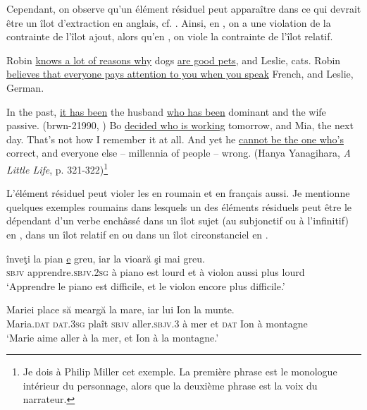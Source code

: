 Cependant, on observe qu’un élément résiduel peut apparaître dans ce qui devrait être un îlot d’extraction en anglais, cf. \citet{CulicoverEtAl2005}. Ainsi, en , on a une violation de la contrainte de l’îlot ajout, alors qu’en , on viole la contrainte de l’îlot relatif.

\ea \label{ch2:ex216}
\ea Robin \uline{knows a lot of reasons why} dogs \uline{are good pets}, and Leslie, cats. \citep[273]{CulicoverEtAl2005}     
\ex Robin \uline{believes that everyone pays attention to you when you speak} French, and Leslie, German. \citep[273]{CulicoverEtAl2005}
\z
\z

\ea \label{ch2:ex217}
\ea In the past, \uline{it has been} the husband \uline{who has been} dominant and the wife passive. (brwn-21990, \citealt{Bilbiie2013a})
\ex Bo \uline{decided who is working} tomorrow, and Mia, the next day. \citep{Chaves2005}
\ex That’s not how I remember it at all. And yet he \uline{cannot be the one who’s} correct, and everyone else – millennia of people – wrong. (Hanya Yanagihara, \textit{A Little Life}, p. 321-322)\footnote{
 Je dois à Philip Miller cet exemple. La première phrase est le monologue intérieur du personnage, alors que la deuxième phrase est la voix du narrateur.}

\z
\z

L’élément résiduel peut violer les  en roumain et en français aussi. Je mentionne quelques exemples roumains dans lesquels un des éléments résiduels peut être le dépendant d’un verbe enchâssé dans un îlot sujet (au subjonctif ou à l’infinitif) en , dans un îlot relatif en  ou dans un îlot circonstanciel en .

\ea \label{ch2:ex218}
\ea 
\gll {}  înveţi  la  pian  \uline{e}  greu,  iar  la  vioară  şi  mai  greu.\\
\textsc{sbjv}  apprendre.\textsc{sbjv.2sg} à  piano  est  lourd  et  à  violon  aussi plus  lourd\\
\glt ‘Apprendre le piano est difficile, et le violon encore plus difficile.’

\ex 
\gll Mariei    place  să  meargă  la  mare,  iar  lui  Ion  la  munte.\\
Maria.\textsc{dat} \textsc{dat.3sg}  plaît  \textsc{sbjv} aller.\textsc{sbjv.3} à  mer  et  \textsc{dat}  Ion  à  montagne\\
\glt ‘Marie aime aller à la mer, et Ion à la montagne.’

